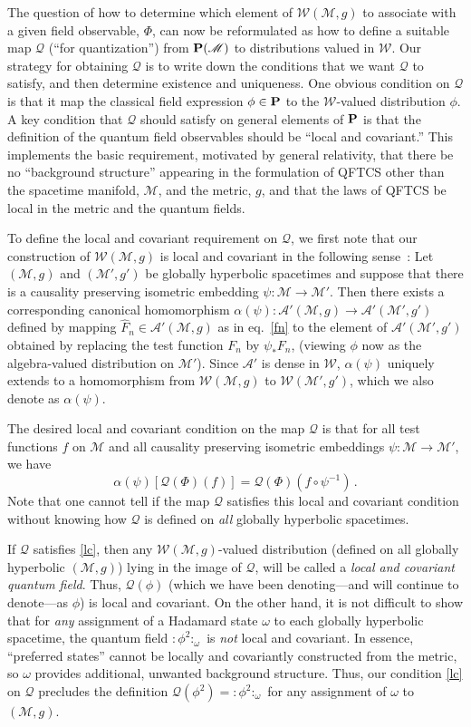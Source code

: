 \documentclass[12pt]{article}
\newcommand{\eA}{\mathscr{A}}
\newcommand{\eM}{\mathscr{M}}
\newcommand{\eQ}{\mathscr{Q}}
\newcommand{\eW}{\mathscr{W}}
\newcommand{\M}{\mathscr{M}}
\renewcommand{\O}{\Phi}
\renewcommand{\P}{{\bf P}}
\theoremstyle{plain}
\theoremstyle{definition}
\def\ben{\begin{equation}}
\def\een{\end{equation}}
\begin{document}
The question of how to determine which element of $\eW(\M,g)$ to associate with a given field observable, $\O$,
can now be reformulated as how to define a suitable map
$\eQ$ (``for quantization'') from $\P(\M)$ to distributions valued in $\eW$. Our strategy for obtaining $\eQ$ is to write down the conditions that we want $\eQ$
to satisfy, and then determine existence and uniqueness. One obvious condition on $\eQ$ is that it map the classical field expression $\phi \in \P$ to the $\eW$-valued distribution $\phi$. A key condition that $\eQ$ should satisfy
on general elements of $\P$ is that the definition of the quantum field observables should be ``local and covariant.'' This implements
the basic requirement, motivated by general relativity, that there be no ``background structure''
appearing in the formulation of QFTCS
other than the spacetime manifold, $\M$, and the metric, $g$, and that the laws of
QFTCS be local in the metric and the quantum fields. 

To define the local and covariant requirement on $\eQ$,
we first note that our construction of $\eW(\M,g)$ is local and covariant in the following sense~\cite{bfv}:
Let $(\M,g)$ and $(\M',g')$
be globally hyperbolic spacetimes and suppose
that there is a causality preserving isometric embedding
$\psi:\M \to \M'$. Then there exists a corresponding canonical homomorphism $\alpha(\psi): \eA'(\M,g) \to \eA'(\M',g')$
defined by mapping $\hat{F}_n \in \eA'(\M,g)$ as in eq.~\eqref{fn} to the
element of $\eA'(\M',g')$ obtained by replacing the test function $F_n$ by $\psi_* F_n$, (viewing $\phi$
now as the algebra-valued distribution on $\M'$). Since $\eA'$ is dense in $\eW$, $\alpha(\psi)$ uniquely extends to a homomorphism
from $\eW(\M,g)$ to $\eW(\M',g')$, which we also denote as $\alpha(\psi)$. 

The desired local and covariant
condition on the
map $\eQ$ is that for all test functions $f$ on $\eM$ and all causality preserving isometric embeddings
$\psi: \eM \to \eM'$, we have~\cite{bfv}
\ben
\alpha(\psi) [\eQ(\O)(f)] = \eQ(\O) (f \circ \psi^{-1}) \, .
\label{lc}
\een
Note that one cannot tell if the map $\eQ$ satisfies this local and covariant condition without knowing how $\eQ$ is defined on {\em all} globally hyperbolic spacetimes.

If $\eQ$ satisfies \eqref{lc}, then any $\eW(\M,g)$-valued distribution (defined on all globally hyperbolic $(\M,g)$) lying in the image of $\eQ$, will be called a {\it local and covariant quantum field}. Thus, $\eQ(\phi)$ (which we have been denoting---and will continue to denote---as $\phi$) is local and covariant. On the other hand, it is not difficult to show
that for {\em any} assignment of a Hadamard state $\omega$ to each globally hyperbolic spacetime, the quantum field $:\phi^2:_{\omega}$
is {\em not} local and covariant. In essence, ``preferred states'' cannot be locally and covariantly constructed from the
metric, so $\omega$ provides additional, unwanted background structure. Thus, our condition \eqref{lc} on $\eQ$ precludes
the definition $\eQ(\phi^2) = :\phi^2:_{\omega}$ for any assignment of $\omega$ to $(\M,g)$.
\end{document}
